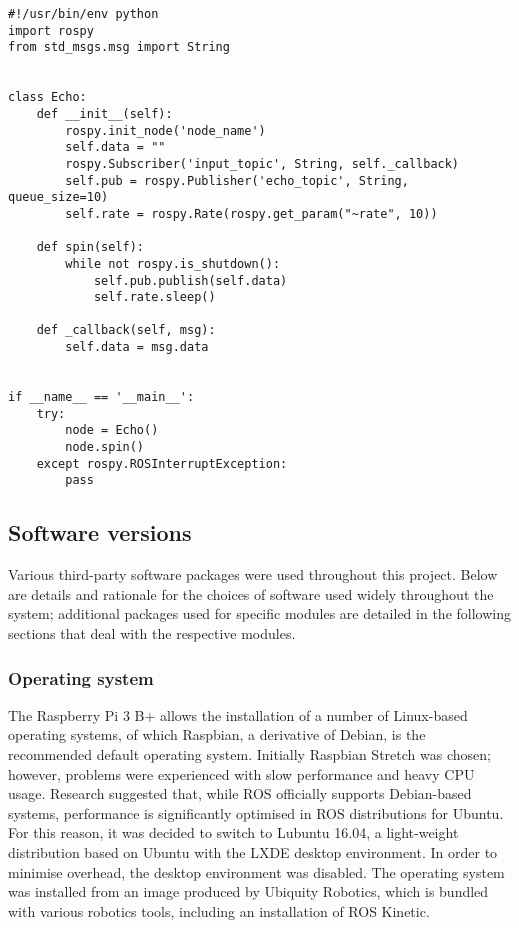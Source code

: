 \begin{lstlisting}[caption={Example ROS node}, label={lst:ros_node}]
#!/usr/bin/env python
import rospy
from std_msgs.msg import String


class Echo:
    def __init__(self):
        rospy.init_node('node_name')
        self.data = ""
        rospy.Subscriber('input_topic', String, self._callback)
        self.pub = rospy.Publisher('echo_topic', String, queue_size=10)
        self.rate = rospy.Rate(rospy.get_param("~rate", 10))

    def spin(self):
        while not rospy.is_shutdown():
            self.pub.publish(self.data)
            self.rate.sleep()

    def _callback(self, msg):
        self.data = msg.data


if __name__ == '__main__':
    try:
        node = Echo()
        node.spin()
    except rospy.ROSInterruptException:
        pass
\end{lstlisting}

\subsection{Software versions}
Various third-party software packages were used throughout this project.
Below are details and rationale for the choices of software used
widely throughout the system; additional packages used for specific modules
are detailed in the following sections that deal with the respective modules.

\subsubsection{Operating system}
The Raspberry Pi 3 B+ allows the installation of a number of Linux-based
operating systems, of which Raspbian, a derivative of Debian, is the
recommended default operating system. Initially Raspbian Stretch was chosen;
however, problems were experienced with slow performance and heavy CPU usage.
Research suggested that, while ROS officially supports Debian-based
systems, performance is significantly optimised in ROS distributions for
Ubuntu. For this reason, it was decided to switch to Lubuntu 16.04, a light-weight
distribution based on Ubuntu with the LXDE desktop environment.
In order to minimise overhead, the desktop environment was disabled. The
operating system was installed from an image produced by Ubiquity
Robotics, which is
bundled with various robotics tools, including an installation of ROS
Kinetic.

